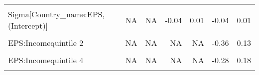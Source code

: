 \begin{table}
\begin{tabular}[t]{lrrrrrr}
\cellcolor{gray!10}{b[EPS Country\_name:US]} & \cellcolor{gray!10}{NA} & \cellcolor{gray!10}{NA} & \cellcolor{gray!10}{-0.16} & \cellcolor{gray!10}{0.13} & \cellcolor{gray!10}{-0.16} & \cellcolor{gray!10}{0.13}\\
Sigma[Country\_name:EPS,(Intercept)] & NA & NA & -0.04 & 0.01 & -0.04 & 0.01\\
\cellcolor{gray!10}{Sigma[Country\_name:EPS,EPS]} & \cellcolor{gray!10}{NA} & \cellcolor{gray!10}{NA} & \cellcolor{gray!10}{0.00} & \cellcolor{gray!10}{0.05} & \cellcolor{gray!10}{0.00} & \cellcolor{gray!10}{0.05}\\
EPS:Incomequintile 2 & NA & NA & NA & NA & -0.36 & 0.13\\
\cellcolor{gray!10}{EPS:Incomequintile 3} & \cellcolor{gray!10}{NA} & \cellcolor{gray!10}{NA} & \cellcolor{gray!10}{NA} & \cellcolor{gray!10}{NA} & \cellcolor{gray!10}{-0.29} & \cellcolor{gray!10}{0.18}\\
EPS:Incomequintile 4 & NA & NA & NA & NA & -0.28 & 0.18\\
\cellcolor{gray!10}{EPS:Incomequintile 5} & \cellcolor{gray!10}{NA} & \cellcolor{gray!10}{NA} & \cellcolor{gray!10}{NA} & \cellcolor{gray!10}{NA} & \cellcolor{gray!10}{-0.42} & \cellcolor{gray!10}{0.03}\\
\bottomrule
\end{tabular}
\end{table}

